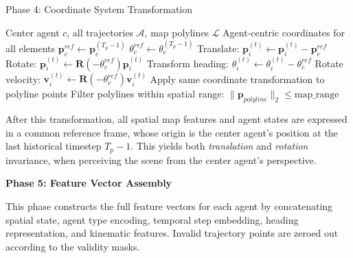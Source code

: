 \begin{algorithm}[H]
\caption{Phase 4: Coordinate System Transformation}
\label{alg:phase4_transform}
\begin{algorithmic}[1]
\REQUIRE Center agent \(c\), all trajectories \(\mathcal{A}\), map polylines \(\mathcal{L}\)
\ENSURE Agent-centric coordinates for all elements
\STATE \(\boldsymbol{p}_c^{ref} \leftarrow \boldsymbol{p}_c^{(T_p-1)}\) 
\STATE \(\theta_c^{ref} \leftarrow \theta_c^{(T_p-1)}\) 
    \STATE Translate: \(\boldsymbol{p}_i^{(t)} \leftarrow \boldsymbol{p}_i^{(t)} - \boldsymbol{p}_c^{ref}\)
    \STATE Rotate: \(\boldsymbol{p}_i^{(t)} \leftarrow \mathbf{R}(-\theta_c^{ref}) \boldsymbol{p}_i^{(t)}\)
    \STATE Transform heading: \(\theta_i^{(t)} \leftarrow \theta_i^{(t)} - \theta_c^{ref}\)
    \STATE Rotate velocity: \(\boldsymbol{v}_i^{(t)} \leftarrow \mathbf{R}(-\theta_c^{ref}) \boldsymbol{v}_i^{(t)}\)
\ENDFOR
{}
    \STATE Apply same coordinate transformation to polyline points
    \STATE Filter polylines within spatial range: \(\|\boldsymbol{p}_{polyline}\|_2 \leq \text{map\_range}\)
\ENDFOR
\end{algorithmic}
\end{algorithm}

After this transformation, all spatial map features and agent states are expressed in a common reference frame, whose origin is the center agent's position at the last historical timestep \(T_p-1\). This yields both \emph{translation} and \emph{rotation} invariance, when perceiving the scene from the center agent's perspective.

\textbf{Phase 5: Feature Vector Assembly}

This phase constructs the full feature vectors for each agent by concatenating spatial state, agent type encoding, temporal step embedding, heading representation, and kinematic features. Invalid trajectory points are zeroed out according to the validity masks.


